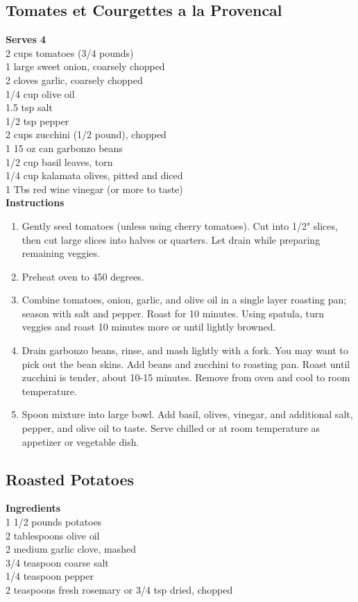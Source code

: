 \documentclass{article}
\numberwithin{figure}{section}
\numberwithin{equation}{section}
\begin{document}
\subsection{Tomates et Courgettes a la Provencal}
{\bf Serves 4}\\
2 cups tomatoes (3/4 pounds)\\
1 large sweet onion, coarsely chopped\\
2 cloves garlic, coarsely chopped\\
1/4 cup olive oil\\
1.5 tsp salt\\
1/2 tsp pepper\\
2 cups zucchini (1/2 pound), chopped\\
1 15 oz can garbonzo beans\\
1/2 cup basil leaves, torn\\
1/4 cup kalamata olives, pitted and diced\\
1 Tbs red wine vinegar (or more to taste)\\

{\bf Instructions}
\begin{enumerate}
\item Gently seed tomatoes (unless using cherry tomatoes). Cut into 1/2" slices, then cut large slices into halves or quarters. Let drain while preparing remaining veggies.
\item Preheat oven to 450 degrees.
\item Combine tomatoes, onion, garlic, and olive oil in a single layer roasting pan; season with salt and pepper. Roast for 10 minutes. Using spatula, turn veggies and roast 10 minutes more or until lightly browned.
\item Drain garbonzo beans, rinse, and mash lightly with a fork. You may want to pick out the bean skins. Add beans and zucchini to roasting pan. Roast until zucchini is tender, about 10-15 minutes. Remove from oven and cool to room temperature.
\item Spoon mixture into large bowl. Add basil, olives, vinegar, and additional salt, pepper, and olive oil to taste. Serve chilled or at room temperature as appetizer or vegetable dish.
\end{enumerate}

\pagebreak
\subsection{Roasted Potatoes}
{\bf Ingredients}\\
1 1/2 pounds potatoes\\
2 tablespoons olive oil\\
2 medium garlic clove, mashed\\
3/4 teaspoon coarse salt\\
1/4 teaspoon pepper\\
2 teaspoons fresh rosemary or 3/4 tsp dried, chopped\\
\end{document}

